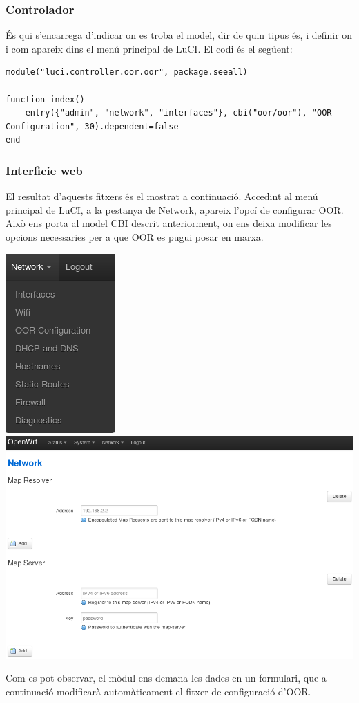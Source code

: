 \documentclass[11pt]{article}
\begin{document}
\subsubsection{Controlador}
És qui s’encarrega d’indicar on es troba el model, dir de quin tipus és, i definir on i com apareix dins el menú principal de LuCI. El codi és el següent:\\
\begin{lstlisting}[frame=single]
module("luci.controller.oor.oor", package.seeall)

function index()
    entry({"admin", "network", "interfaces"}, cbi("oor/oor"), "OOR Configuration", 30).dependent=false
end
\end{lstlisting}

\subsubsection{Interficie web}
El resultat d’aquests fitxers és el mostrat a continuació. Accedint al menú principal de LuCI, a la pestanya de Network, apareix l’opcí de configurar OOR. Això ens porta al model CBI descrit anteriorment, on ens deixa modificar les opcions necessaries per a que OOR es pugui posar en marxa.

\begin{center}
	\includegraphics{luci1}
	\\
	\includegraphics[width=15cm]{luci2}
\end{center}
Com es pot observar, el mòdul ens demana les dades en un formulari, que a continuació modificarà automàticament el fitxer de configuració d’OOR.
\end{document}
